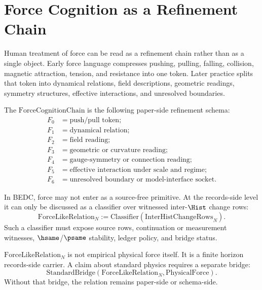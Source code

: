 \section{Force Cognition as a Refinement Chain}
\label{sec:layered-relation-force-chain}

Human treatment of force can be read as a refinement chain rather than as a single object. Early force language compresses pushing, pulling, falling, collision, magnetic attraction, tension, and resistance into one token. Later practice splits that token into dynamical relations, field descriptions, geometric readings, symmetry structures, effective interactions, and unresolved boundaries.

\begin{definition}
\label{def:layered-relation-force-cognition-chain}
The $\mathrm{ForceCognitionChain}$ is the following paper-side refinement schema:
$$
\begin{aligned}
F_0 &= \text{push/pull token};\\
F_1 &= \text{dynamical relation};\\
F_2 &= \text{field reading};\\
F_3 &= \text{geometric or curvature reading};\\
F_4 &= \text{gauge-symmetry or connection reading};\\
F_5 &= \text{effective interaction under scale and regime};\\
F_6 &= \text{unresolved boundary or model-interface socket}.
\end{aligned}
$$
\end{definition}

\begin{principle}
\label{prin:layered-relation-force-not-primitive}
In BEDC, force may not enter as a source-free primitive. At the records-side level it can only be discussed as a classifier over witnessed inter-$\Hist$ change rows:
$$
\mathrm{ForceLikeRelation}_N :=
\mathrm{Classifier}(\mathrm{InterHistChangeRows}_N).
$$
Such a classifier must expose source rows, continuation or measurement witnesses, $\hsame$/$\psame$ stability, ledger policy, and bridge status.
\end{principle}

\begin{remark}
\label{rem:layered-relation-physical-content-bridged}
$\mathrm{ForceLikeRelation}_N$ is not empirical physical force itself. It is a finite horizon records-side carrier. A claim about standard physics requires a separate bridge:
$$
\mathrm{StandardBridge}(\mathrm{ForceLikeRelation}_N,\mathrm{PhysicalForce}).
$$
Without that bridge, the relation remains paper-side or schema-side.
\end{remark}

